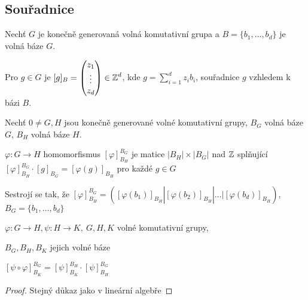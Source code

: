 \subsection{Souřadnice}
Nechť $G$ je konečně generovaná volná komutativní grupa a $B = \{b_1, \dots, b_d\}$ je volná báze $G$.

Pro $g \in G$ je $[g]_B = \begin{pmatrix}
z_1 \\
\vdots \\
z_d
\end{pmatrix} \in \operatorname{\mathbb{Z}}^d$, kde $g = \sum_{i = 1}^d z_ib_i$, souřadnice $g$ vzhledem k bázi $B$.

\begin{definition}
Nechť $0 \neq G,H$ jsou konečně generované volné komutativní grupy, $B_G$ volná báze $G$, $B_H$ volná báze $H$.

$\varphi: G \rightarrow H$ homomorfismus $[\varphi]_{B_H}^{B_G}$ je matice $|B_H| \times |B_G|$ nad $\operatorname{\mathbb{Z}}$ 
splňující $[\varphi]_{B_H}^{B_G}\cdot[g]_{B_G}=[\varphi(g)]_{B_H}$ pro každé $g\in G$
\end{definition}

Sestrojí se tak, že $[\varphi]_{B_H}^{B_G} = ([\varphi(b_1)]_{B_H}|[\varphi(b_2)]_{B_H}| \dots | [\varphi(b_d)]_{B_H})$, $B_G=\{b_1,\ldots,b_d\}$

\begin{claim}
$\varphi:G\rightarrow H,\psi:H\rightarrow K,\ G,H,K$ volné komutativní grupy,

$B_G, B_H, B_K$ jejich volné báze

$[\psi \circ \varphi]_{B_K}^{B_G} = [\psi]_{B_K}^{B_H} \cdot [\psi]_{B_H}^{B_G}$
\end{claim}
\begin{proof}
Stejný důkaz jako v lineární algebře
\end{proof}